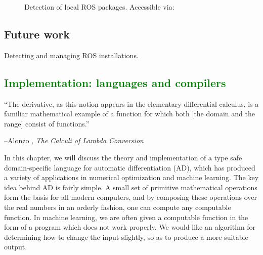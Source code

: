 \documentclass[12pt,initial,twoside,maitrise]{dms}
\newcommand{\welldone}[1]{\textcolor{green}{#1}}
\numberwithin{equation}{section}
\numberwithin{table}{chapter}
\numberwithin{figure}{chapter}
\begin{document}
\begin{figure}
    \centering
    \caption{Detection of local ROS packages. Accessible via: }
    \label{fig:ros_settings}
\end{figure}

\section{Future work}

Detecting and managing ROS installations.

\welldone{\chapter{Implementation: languages and compilers}\label{ch:kotlingrad}}

\setlength{\epigraphwidth}{0.7\textwidth}
\epigraph{``The derivative, as this notion appears in the elementary differential calculus, is a familiar mathematical example of a function for which both [the domain and the range] consist of functions.''}{\begin{flushright}--Alonzo \citet{church1985calculi}, \textit{The Calculi of Lambda Conversion}\end{flushright}}

In this chapter, we will discuss the theory and implementation of a type safe domain-specific language for automatic differentiation (AD), which has produced a variety of applications in numerical optimization and machine learning. The key idea behind AD is fairly simple. A small set of primitive mathematical operations form the basis for all modern computers, and by composing these operations over the real numbers in an orderly fashion, one can compute any computable function. In machine learning, we are often given a computable function in the form of a program which does not work properly. We would like an algorithm for determining how to change the input slightly, so as to produce a more suitable output.
\end{document}
